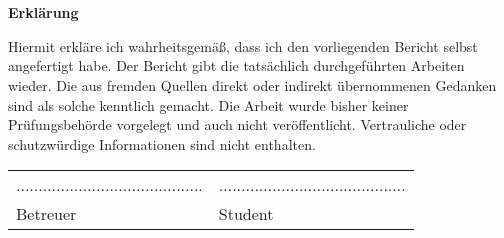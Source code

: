 \chapter*{}\label{ch:erklaerung}
\begin{center}
    \large \textbf{Erklärung}
\end{center}
Hiermit erkläre ich wahrheitsgemäß, dass ich den vorliegenden Bericht selbst angefertigt habe.
Der Bericht gibt die tatsächlich durchgeführten Arbeiten wieder.
Die aus fremden Quellen direkt oder indirekt übernommenen Gedanken sind als solche kenntlich gemacht.
Die Arbeit wurde bisher keiner Prüfungsbehörde vorgelegt und auch nicht veröffentlicht.
Vertrauliche oder schutzwürdige Informationen sind nicht enthalten.

\vspace{2\baselineskip}

\begin{tabular}{ll}
    .......................................... & .......................................... \\
    Betreuer                                   & Student
\end{tabular}
